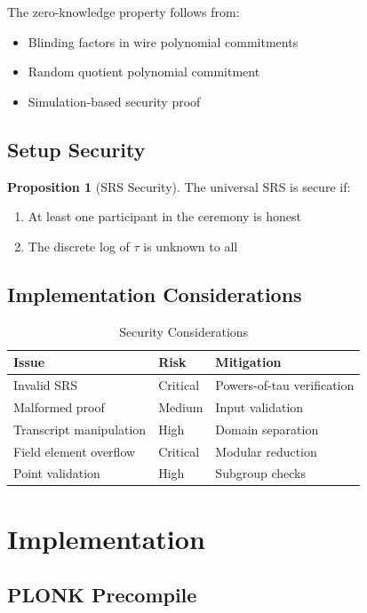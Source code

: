 \documentclass[11pt,a4paper]{article}
\theoremstyle{definition}
\newtheorem{proposition}{Proposition}
\begin{document}
The zero-knowledge property follows from:
\begin{itemize}
    \item Blinding factors in wire polynomial commitments
    \item Random quotient polynomial commitment
    \item Simulation-based security proof
\end{itemize}

\subsection{Setup Security}

\begin{proposition}[SRS Security]
    The universal SRS is secure if:
    \begin{enumerate}
        \item At least one participant in the ceremony is honest
        \item The discrete log of $\tau$ is unknown to all
    \end{enumerate}
\end{proposition}

\subsection{Implementation Considerations}

\begin{table}[h]
\centering
\caption{Security Considerations}
\begin{tabular}{lll}
\toprule
Issue & Risk & Mitigation \\
\midrule
Invalid SRS & Critical & Powers-of-tau verification \\
Malformed proof & Medium & Input validation \\
Transcript manipulation & High & Domain separation \\
Field element overflow & Critical & Modular reduction \\
Point validation & High & Subgroup checks \\
\bottomrule
\end{tabular}
\end{table}

\section{Implementation}

\subsection{PLONK Precompile}
\end{document}
